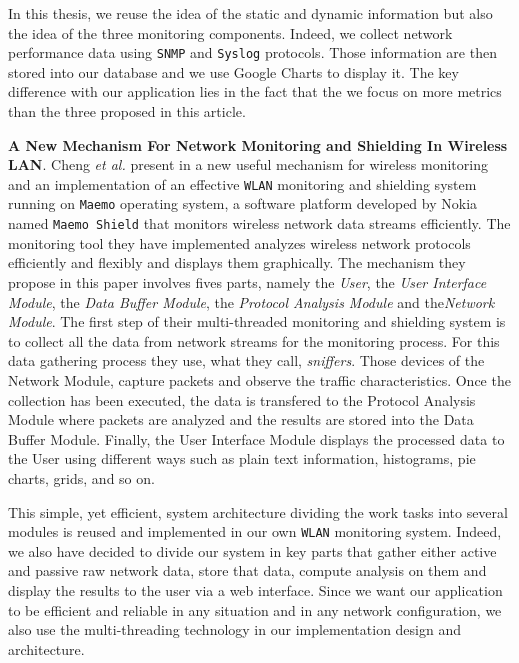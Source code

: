 In this thesis, we reuse the idea of the static and dynamic information but also the idea of the three monitoring components. Indeed, we collect network performance data using \texttt{SNMP} and \texttt{Syslog} protocols. Those information are then stored into our database and we use Google Charts to display it. The key difference with our application lies in the fact that the we focus on more metrics than the three proposed in this article.


\textbf{A New Mechanism For Network Monitoring and Shielding In Wireless LAN}. Cheng \textit{et al.} present in \cite{article2} a new useful mechanism for wireless monitoring and an implementation of an effective \texttt{WLAN} monitoring and shielding system running on \texttt{Maemo} operating system, a software platform developed by Nokia named \texttt{Maemo Shield} that monitors wireless network data streams efficiently. The monitoring tool they have implemented analyzes wireless network protocols efficiently and flexibly and displays them graphically. The mechanism they propose in this paper involves fives parts, namely the \textit{User}, the \textit{User Interface Module}, the \textit{Data Buffer Module}, the \textit{Protocol Analysis Module} and the\textit{Network Module}. The first step of their multi-threaded monitoring and shielding system is to collect all the data from network streams for the monitoring process. For this data gathering process they use, what they call, \textit{sniffers}. Those devices of the Network Module, capture packets and observe the traffic characteristics. Once the collection has been executed, the data is transfered to the Protocol Analysis Module where packets are analyzed and the results are stored into the Data Buffer Module. Finally, the User Interface Module displays the processed data to the User using different ways such as plain text information, histograms, pie charts, grids, and so on.

This simple, yet efficient, system architecture dividing the work tasks into several modules is reused and implemented in our own \texttt{WLAN} monitoring system. Indeed, we also have decided to divide our system in key parts that gather either active and passive raw network data, store that data, compute analysis on them and display the results to the user via a web interface. Since we want our application to be efficient and reliable in any situation and in any network configuration, we also use the multi-threading technology in our implementation design and architecture.


